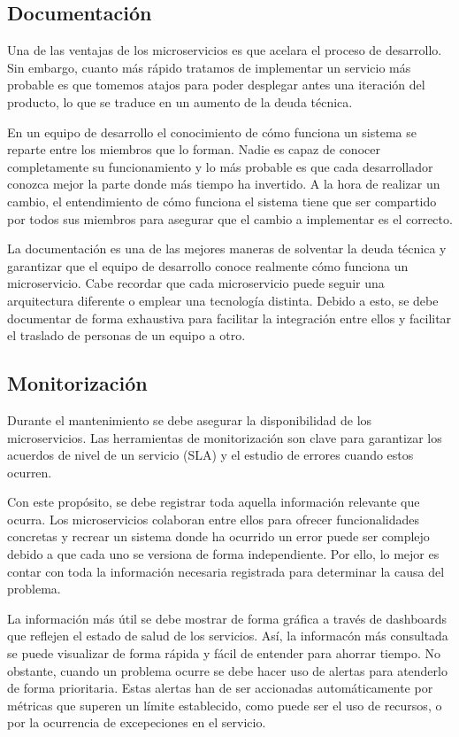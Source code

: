 \documentclass[11pt,spanish,listoffigures,listoftables]{tfgetsinf}
\begin{document}
\subsection{Documentación}

Una de las ventajas de los microservicios es que acelara el proceso de desarrollo. Sin embargo, cuanto más rápido tratamos de implementar un servicio más probable es que tomemos atajos para poder desplegar antes una iteración del producto, lo que se traduce en un aumento de la deuda técnica. \cite{FowlerSusan}

En un equipo de desarrollo el conocimiento de cómo funciona un sistema se reparte entre los miembros que lo forman. Nadie es capaz de conocer completamente su funcionamiento y lo más probable es que cada desarrollador conozca mejor la parte donde más tiempo ha invertido. A la hora de realizar un cambio, el entendimiento de cómo funciona el sistema tiene que ser compartido por todos sus miembros para asegurar que el cambio a implementar es el correcto.

La documentación es una de las mejores maneras de solventar la deuda técnica y garantizar que el equipo de desarrollo conoce realmente cómo funciona un microservicio. Cabe recordar que cada microservicio puede seguir una arquitectura diferente o emplear una tecnología distinta. Debido a esto, se debe documentar de forma exhaustiva para facilitar la integración entre ellos y facilitar el traslado de personas de un equipo a otro.

\subsection{Monitorización}

Durante el mantenimiento se debe asegurar la disponibilidad de los microservicios. Las herramientas de monitorización son clave para garantizar los acuerdos de nivel de un servicio (SLA) y el estudio de errores cuando estos ocurren.

Con este propósito, se debe registrar toda aquella información relevante que ocurra. Los microservicios colaboran entre ellos para ofrecer funcionalidades concretas y recrear un sistema donde ha ocurrido un error puede ser complejo debido a que cada uno se versiona de forma independiente. Por ello, lo mejor es contar con toda la información necesaria registrada para determinar la causa del problema.

La información más útil se debe mostrar de forma gráfica a través de dashboards que reflejen el estado de salud de los servicios. Así, la informacón más consultada se puede visualizar de forma rápida y fácil de entender para ahorrar tiempo. No obstante, cuando un problema ocurre se debe hacer uso de alertas para atenderlo de forma prioritaria. Estas alertas han de ser accionadas automáticamente por métricas que superen un límite establecido, como puede ser el uso de recursos, o por la ocurrencia de excepeciones en el servicio. \cite{FowlerSusan}
\end{document}
